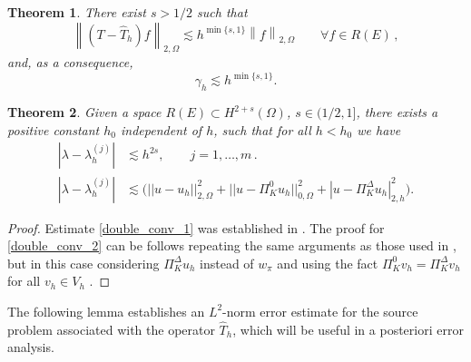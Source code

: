 \documentclass[final,reqno]{elsarticle}
\newtheorem{theorem}{Theorem}[section]
\def\l{\lambda}
\def\PiK{\Pi_{K}^{\Delta}}
\begin{document}
\begin{theorem}
There exist $s> 1/2$  such that
\begin{equation}
\left\|(T -\widehat{T}_{h})f\right\|_{2,\Omega}
\lesssim  h^{\min\{s,1\} }\left\|f\right\|_{2,\Omega}\qquad \forall f\in R(E)\,,
\label{bou_gamma_h}    
\end{equation}
and, as a consequence,
\begin{equation}
\gamma_{h}  \lesssim  h^{\min\{s,1\} }. 
\label{bound1r}
\end{equation}
\label{gapr}
\end{theorem}

\begin{theorem}
Given a space $R(E)\subset H^{2+s}(\Omega)$, ${s}\in(1/2,1]$, 
there exists a positive constant $h_0$ independent of $h$, 
such that for all $ h<h_0$ we have 
\begin{subequations}\label{teo:mainConv}
\begin{align}
\left|\l-\l_h^{(j)}\right|&\lesssim  h^{2s},\qquad j=1,\ldots,m\,.\label{double_conv_1}\\[1ex]
\left|\l-\l_h^{(j)}\right|&\lesssim \Big( ||u-u_h||_{2,\Omega}^2 + ||u-\Pi_K^0 u_h||_{0,\Omega}^2 + |u- \PiK u_h|_{2,h}^2 \Big)\label{double_conv_2}.
\end{align}
\end{subequations}
\end{theorem}
\begin{proof}
Estimate \eqref{double_conv_1} was established in \cite[Theorem~4.5]{MRV2018}. The proof for \eqref{double_conv_2} can be follows repeating the same arguments as those used in \cite[Theorem~4.5]{MRV2018}, but in this case considering  $\PiK u_h$ instead of $w_{\pi}$ and using the fact  $\Pi_K^0v_h=\PiK v_h$ for all $v_h\in V_h$ .
\end{proof}



The following lemma establishes an $L^2$-norm error estimate for the source problem associated with the operator $\widehat{T}_h$, which will be useful in a posteriori error analysis.
\end{document}
